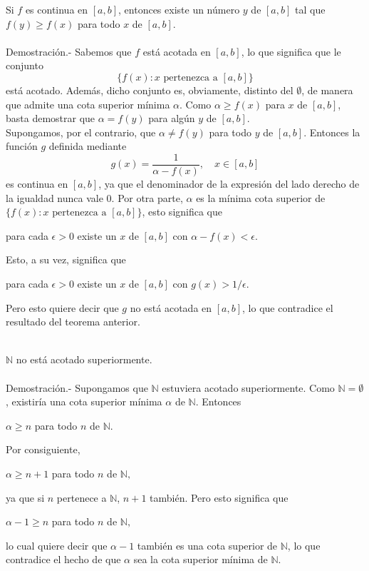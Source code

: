 \begin{teo}
    Si $f$ es continua en $[a,b]$, entonces existe un número $y$ de $[a,b]$ tal que $f(y)\geq f(x)$ para todo $x$ de $[a,b]$.\\\\
	Demostración.-\; Sabemos que $f$ está acotada en $[a,b]$, lo que significa que le conjunto
	$$\lbrace f(x):x \mbox{ pertenezca a }[a,b]\rbrace$$
	está acotado. Además, dicho conjunto es, obviamente, distinto del $\emptyset$, de manera que admite una cota superior mínima $\alpha$. Como $\alpha\geq f(x)$ para $x$ de $[a,b]$, basta demostrar que $\alpha=f(y)$ para algún $y$ de $[a,b]$.\\
	Supongamos, por el contrario, que $\alpha\neq f(y)$ para todo $y$ de $[a,b]$. Entonces la función $g$ definida mediante
	$$g(x)=\dfrac{1}{\alpha-f(x)},\quad x\in [a,b]$$
	es continua en $[a,b]$, ya que el denominador de la expresión del lado derecho de la igualdad nunca vale $0$. Por otra parte, $\alpha$ es la mínima cota superior de $\lbrace f(x):x \mbox{ pertenezca a }[a,b] \rbrace$, esto significa que 
	\begin{center}
	    para cada $\epsilon > 0$ existe un $x$ de $[a,b]$ con $\alpha - f(x)<\epsilon$.
	\end{center}
	Esto, a su vez, significa que 
	\begin{center}
	    para cada $\epsilon > 0$ existe un $x$ de $[a,b]$ con $g(x)>1/\epsilon$.
	\end{center}
	Pero esto quiere decir que $g$ no está acotada en $[a,b]$, lo que contradice el resultado del teorema anterior.\\\\
\end{teo}

\setcounter{chapter}{8}
\setcounter{teo}{1}
\begin{teo}
    $\mathbb{N}$ no está acotado superiormente.\\\\
	Demostración.-\; Supongamos que $\mathbb{N}$ estuviera acotado superiormente. Como $\mathbb{N}=\emptyset$, existiría una cota superior mínima $\alpha$ de $\mathbb{N}$. Entonces
	\begin{center}
	    $\alpha\geq n$ para todo $n$ de $\mathbb{N}.$
	\end{center}
	Por consiguiente,
	\begin{center}
	    $\alpha\geq n+1$ para todo $n$ de $\mathbb{N},$
	\end{center}
	ya que si $n$ pertenece a $\mathbb{N}$, $n+1$ también. Pero esto significa que 
	\begin{center}
	    $\alpha-1\geq n$ para todo $n$ de $\mathbb{N},$
	\end{center}
	lo cual quiere decir que $\alpha-1$ también es una cota superior de $\mathbb{N}$, lo que contradice el hecho de que $\alpha$ sea la cota superior mínima de $\mathbb{N}$.\\\\
\end{teo}

